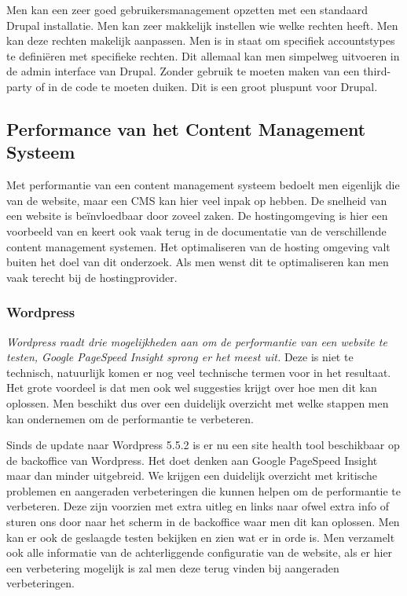 Men kan een zeer goed gebruikersmanagement opzetten met een standaard Drupal installatie. Men kan zeer makkelijk instellen wie welke rechten heeft. Men kan deze rechten makelijk aanpassen. Men is in staat om specifiek accountstypes te definiëren met specifieke rechten. Dit allemaal kan men simpelweg uitvoeren in de admin interface van Drupal. Zonder gebruik te moeten maken van een third-party of in de code te moeten duiken. Dit is een groot pluspunt voor Drupal.

\subsection{Performance van het Content Management Systeem}
Met performantie van een content management systeem bedoelt men eigenlijk die van de website, maar een CMS kan hier veel inpak op hebben. De snelheid van een website is beïnvloedbaar door zoveel zaken. De hostingomgeving is hier een voorbeeld van en keert ook vaak terug in de documentatie van de verschillende content management systemen. Het optimaliseren van de hosting omgeving valt buiten het doel van dit onderzoek. Als men wenst dit te optimaliseren kan men vaak terecht bij de hostingprovider.

\subsubsection{Wordpress}
\textit{Wordpress raadt drie mogelijkheden aan om de performantie van een website te testen, Google PageSpeed Insight sprong er het meest uit.} \autocite{WordpressCommunity2019b} Deze is niet te technisch, natuurlijk komen er nog veel technische termen voor in het resultaat. Het grote voordeel is dat men ook wel suggesties krijgt over hoe men dit kan oplossen. Men beschikt dus over een duidelijk overzicht met welke stappen men kan ondernemen om de performantie te verbeteren.

Sinds de update naar Wordpress 5.5.2 is er nu een site health tool beschikbaar op de backoffice van Wordpress. Het doet denken aan Google PageSpeed Insight maar dan minder uitgebreid. We krijgen een duidelijk overzicht met kritische problemen en aangeraden verbeteringen die kunnen helpen om de performantie te verbeteren. Deze zijn voorzien met extra uitleg en links naar ofwel extra info of sturen ons door naar het scherm in de backoffice waar men dit kan oplossen. Men kan er ook de geslaagde testen bekijken en zien wat er in orde is. Men verzamelt ook alle informatie van de achterliggende configuratie van de website, als er hier een verbetering mogelijk is zal men deze terug vinden bij aangeraden verbeteringen.

